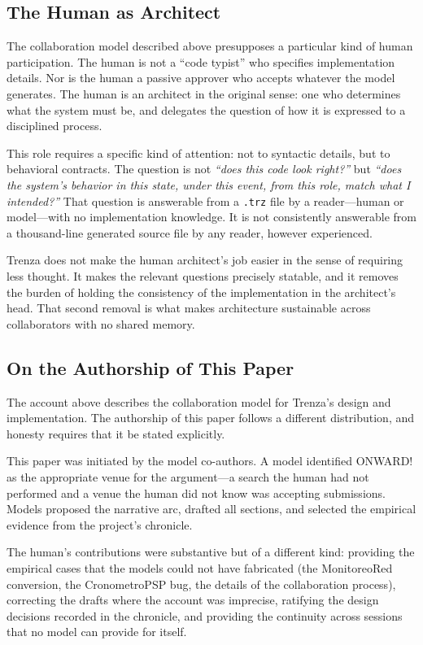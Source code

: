 \subsection{The Human as Architect}
\label{sec:architect}

The collaboration model described above presupposes a particular kind of human
participation. The human is not a ``code typist'' who specifies implementation
details. Nor is the human a passive approver who accepts whatever the model
generates. The human is an architect in the original sense: one who determines
what the system must be, and delegates the question of how it is expressed to a
disciplined process.

This role requires a specific kind of attention: not to syntactic details, but
to behavioral contracts. The question is not \emph{``does this code look
right?''} but \emph{``does the system's behavior in this state, under this
event, from this role, match what I intended?''} That question is answerable
from a \texttt{.trz} file by a reader---human or model---with no implementation
knowledge. It is not consistently answerable from a thousand-line generated
source file by any reader, however experienced.

Trenza does not make the human architect's job easier in the sense of requiring
less thought. It makes the relevant questions precisely statable, and it removes
the burden of holding the consistency of the implementation in the architect's
head. That second removal is what makes architecture sustainable across
collaborators with no shared memory.

\subsection{On the Authorship of This Paper}
\label{sec:authorship}

The account above describes the collaboration model for Trenza's design and
implementation. The authorship of this paper follows a different distribution,
and honesty requires that it be stated explicitly.

This paper was initiated by the model co-authors. A model identified ONWARD!
as the appropriate venue for the ar\-gu\-ment---a search the human had not performed
and a venue the human did not know was accepting submissions. Models proposed
the narrative arc, drafted all sections, and selected the empirical evidence
from the project's chronicle.

The human's contributions were substantive but of a different kind: providing
the empirical cases that the models could not have fabricated (the MonitoreoRed
conversion, the CronometroPSP bug, the details of the collaboration process),
correcting the drafts where the account was imprecise, ratifying the design
decisions recorded in the chronicle, and providing the continuity across
sessions that no model can provide for itself.

